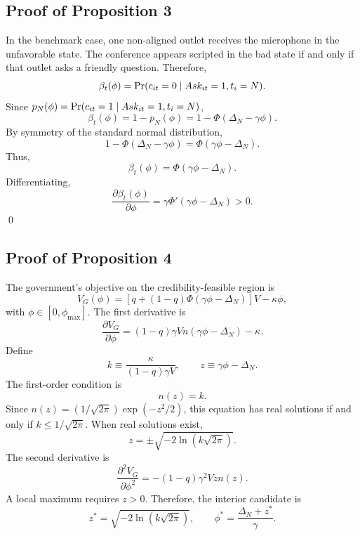 \subsection{Proof of Proposition 3}

In the benchmark case, one non-aligned outlet receives the microphone in the unfavorable state. The conference appears scripted in the bad state if and only if that outlet asks a friendly question. Therefore,
\begin{equation}
    \beta_t(\phi)=\Pr(c_{it}=0\mid Ask_{it}=1,t_i=N).
\end{equation}
Since $p_N(\phi)=\Pr(c_{it}=1\mid Ask_{it}=1,t_i=N)$,
\begin{equation}
    \beta_t(\phi)=1-p_N(\phi)=1-\Phi(\Delta_N-\gamma\phi).
\end{equation}
By symmetry of the standard normal distribution,
\begin{equation}
    1-\Phi(\Delta_N-\gamma\phi)=\Phi(\gamma\phi-\Delta_N).
\end{equation}
Thus,
\begin{equation}
    \beta_t(\phi)=\Phi(\gamma\phi-\Delta_N).
\end{equation}
Differentiating,
\begin{equation}
    \frac{\partial \beta_t(\phi)}{\partial \phi}=\gamma \Phi'(\gamma\phi-\Delta_N)>0.
\end{equation}
\qed

\subsection{Proof of Proposition 4}

The government's objective on the credibility-feasible region is
\begin{equation}
    V_G(\phi)=\left[q+(1-q)\Phi(\gamma\phi-\Delta_N)\right]V-\kappa\phi,
\end{equation}
with $\phi\in[0,\phi_{\max}]$. The first derivative is
\begin{equation}
    \frac{\partial V_G}{\partial \phi}=(1-q)\gamma V n(\gamma\phi-\Delta_N)-\kappa.
\end{equation}
Define
\begin{equation}
    k\equiv \frac{\kappa}{(1-q)\gamma V}, \qquad z\equiv \gamma\phi-\Delta_N.
\end{equation}
The first-order condition is
\begin{equation}
    n(z)=k.
\end{equation}
Since $n(z)=(1/\sqrt{2\pi})\exp(-z^2/2)$, this equation has real solutions if and only if $k\leq 1/\sqrt{2\pi}$. When real solutions exist,
\begin{equation}
    z=\pm\sqrt{-2\ln(k\sqrt{2\pi})}.
\end{equation}
The second derivative is
\begin{equation}
    \frac{\partial^2 V_G}{\partial \phi^2}=-(1-q)\gamma^2V z n(z).
\end{equation}
A local maximum requires $z>0$. Therefore, the interior candidate is
\begin{equation}
    z^*=\sqrt{-2\ln(k\sqrt{2\pi})}, \qquad \phi^*=\frac{\Delta_N+z^*}{\gamma}.
\end{equation}

